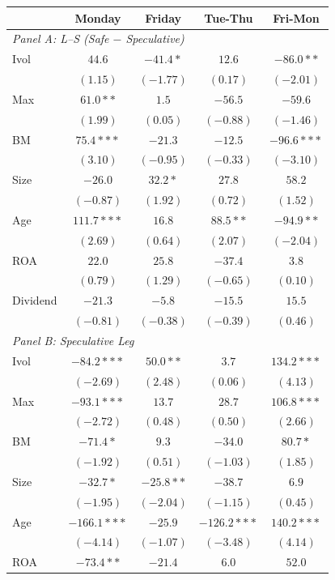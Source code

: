 \centering
\footnotesize
\begin{tabular}{l c c c c}
\toprule
 & Monday & Friday & Tue-Thu & Fri-Mon \\
\midrule
\multicolumn{5}{l}{\textit{Panel A: L--S (Safe $-$ Speculative)}} \\
Ivol & $44.6$ & $-41.4*$ & $12.6$ & $-86.0**$ \\
 & $(1.15)$ & $(-1.77)$ & $(0.17)$ & $(-2.01)$ \\
Max & $61.0**$ & $1.5$ & $-56.5$ & $-59.6$ \\
 & $(1.99)$ & $(0.05)$ & $(-0.88)$ & $(-1.46)$ \\
BM & $75.4***$ & $-21.3$ & $-12.5$ & $-96.6***$ \\
 & $(3.10)$ & $(-0.95)$ & $(-0.33)$ & $(-3.10)$ \\
Size & $-26.0$ & $32.2*$ & $27.8$ & $58.2$ \\
 & $(-0.87)$ & $(1.92)$ & $(0.72)$ & $(1.52)$ \\
Age & $111.7***$ & $16.8$ & $88.5**$ & $-94.9**$ \\
 & $(2.69)$ & $(0.64)$ & $(2.07)$ & $(-2.04)$ \\
ROA & $22.0$ & $25.8$ & $-37.4$ & $3.8$ \\
 & $(0.79)$ & $(1.29)$ & $(-0.65)$ & $(0.10)$ \\
Dividend & $-21.3$ & $-5.8$ & $-15.5$ & $15.5$ \\
 & $(-0.81)$ & $(-0.38)$ & $(-0.39)$ & $(0.46)$ \\
\midrule
\multicolumn{5}{l}{\textit{Panel B: Speculative Leg}} \\
Ivol & $-84.2***$ & $50.0**$ & $3.7$ & $134.2***$ \\
 & $(-2.69)$ & $(2.48)$ & $(0.06)$ & $(4.13)$ \\
Max & $-93.1***$ & $13.7$ & $28.7$ & $106.8***$ \\
 & $(-2.72)$ & $(0.48)$ & $(0.50)$ & $(2.66)$ \\
BM & $-71.4*$ & $9.3$ & $-34.0$ & $80.7*$ \\
 & $(-1.92)$ & $(0.51)$ & $(-1.03)$ & $(1.85)$ \\
Size & $-32.7*$ & $-25.8**$ & $-38.7$ & $6.9$ \\
 & $(-1.95)$ & $(-2.04)$ & $(-1.15)$ & $(0.45)$ \\
Age & $-166.1***$ & $-25.9$ & $-126.2***$ & $140.2***$ \\
 & $(-4.14)$ & $(-1.07)$ & $(-3.48)$ & $(4.14)$ \\
ROA & $-73.4**$ & $-21.4$ & $6.0$ & $52.0$ \\

\end{tabular}
